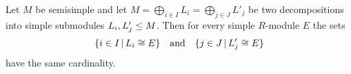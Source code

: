 %   
%   


\begin{theorem}
  \label{theorem: multiplicity well-defined}
  Let $M$ be semisimple and let $M = \bigoplus_{i \in I} L_i = \bigoplus_{j \in J} L'_j$ be two decompositions into simple submodules $L_i, L'_j \leq M$.
  Then for every simple $R$-module $E$ the sets
  \[
    \{ i \in I \suchthat L_i \cong E \}
    \quad\text{and}\quad
    \{ j \in J \suchthat L'_j \cong E \}
  \]
  have the same cardinality.
\end{theorem}


